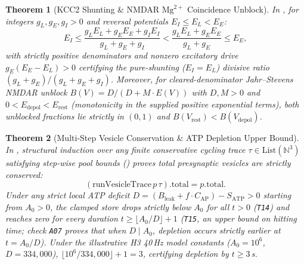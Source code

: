 \documentclass[11pt,letterpaper]{amsart}
\newtheorem{theorem}{Theorem}[section]
\begin{document}
\begin{theorem}[KCC2 Shunting \& NMDAR $\mathrm{Mg}^{2+}$ Coincidence Unblock]
In , for integers $g_L, g_E, g_I > 0$ and reversal potentials $E_I \le E_L < E_E$:
\[
E_I \le \frac{g_L E_L + g_E E_E + g_I E_I}{g_L + g_E + g_I} < \frac{g_L E_L + g_E E_E}{g_L + g_E} \le E_E,
\]
with strictly positive denominators and nonzero excitatory drive $g_E(E_E - E_L) > 0$ certifying the pure-shunting ($E_I = E_L$) divisive ratio $(g_L + g_E)/(g_L + g_E + g_I)$. Moreover, for cleared-denominator Jahr--Stevens NMDAR unblock $B(V) = D/(D + M\cdot E(V))$ with $D, M > 0$ and $0 < E_{\mathrm{depol}} < E_{\mathrm{rest}}$ (monotonicity in the supplied positive exponential terms), both unblocked fractions lie strictly in $(0,1)$ and $B(V_{\mathrm{rest}}) < B(V_{\mathrm{depol}})$.
\end{theorem}

\begin{theorem}[Multi-Step Vesicle Conservation \& ATP Depletion Upper Bound]
In , structural induction over any finite conservative cycling trace $\tau \in \mathrm{List}(\mathbb{N}^3)$ satisfying step-wise pool bounds () proves total presynaptic vesicles are strictly conserved:
\[
(\mathrm{runVesicleTrace}\,p\,\tau).\mathrm{total} = p.\mathrm{total}.
\]
Under any strict local ATP deficit $D = (B_{\mathrm{leak}} + f\cdot C_{\mathrm{AP}}) - S_{\mathrm{ATP}} > 0$ starting from $A_0 > 0$, the clamped store drops strictly below $A_0$ for all $t > 0$ (\texttt{T14}) and reaches zero for every duration $t \ge \lfloor A_0 / D \rfloor + 1$ (\texttt{T15}, an \emph{upper bound} on hitting time; check \texttt{A07} proves that when $D \mid A_0$, depletion occurs strictly earlier at $t = A_0 / D$). Under the illustrative H3 40\,Hz model constants ($A_0 = 10^6$, $D = 334{,}000$), $\lfloor 10^6 / 334{,}000 \rfloor + 1 = 3$, certifying depletion by $t \ge 3\,$s.
\end{theorem}
\end{document}
